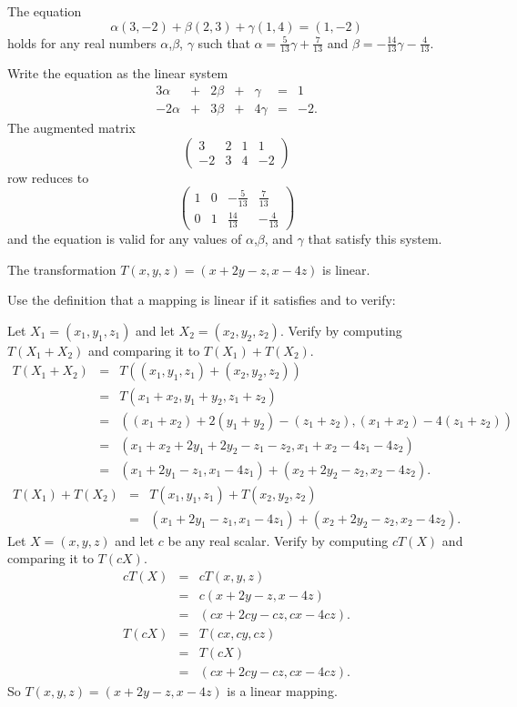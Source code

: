 \ans The equation
\[ \alpha(3,-2) + \beta(2,3) + \gamma(1,4) = (1,-2) \]
holds for any real numbers $\alpha$,$\beta$,
$\gamma$ such that $\alpha = \frac{5}{13}\gamma +
\frac{7}{13}$ and $\beta = -\frac{14}{13}\gamma
- \frac{4}{13}$.

\soln Write the equation as the linear system
\[ \begin{array}{rrrrrrl}
3\alpha & + & 2\beta & + & \gamma & = & 1 \\
-2\alpha & + & 3\beta & + & 4\gamma & = & -2. \end{array} \]
The augmented matrix
\[ \left(\begin{array}{rrr|r}
3 & 2 & 1 & 1 \\
-2 & 3 & 4 & -2 \end{array}\right) \]
row reduces to
\[ \left(\begin{array}{rrr|r}
1 & 0 & -\frac{5}{13} & \frac{7}{13} \\
0 & 1 & \frac{14}{13} & -\frac{4}{13} \end{array}\right) \]
and the equation is valid for any values of $\alpha$,$\beta$,
and $\gamma$ that satisfy this system.

 \ans The transformation $T(x,y,z) = (x + 2y - z, x - 4z)$
is linear.

\soln Use the definition that a mapping is linear if it satisfies
 and  to verify:

\para Let $X_1 = (x_1,y_1,z_1)$ and let $X_2 = (x_2,y_2,z_2)$.
Verify  by computing $T(X_1 + X_2)$ and comparing it
to $T(X_1) + T(X_2)$.
\[ \begin{array}{rcl}
T(X_1 + X_2) & = & T((x_1,y_1,z_1) + (x_2, y_2, z_2)) \\
& = & T(x_1 + x_2, y_1 + y_2, z_1 + z_2) \\
& = & ((x_1 + x_2) + 2(y_1 + y_2) - (z_1 + z_2),
(x_1 + x_2) - 4(z_1 + z_2)) \\ & = &
(x_1 + x_2 + 2y_1 + 2y_2 - z_1 - z_2, x_1 + x_2 - 4z_1 - 4z_2) \\
& = & (x_1 + 2y_1 - z_1, x_1 - 4z_1) +
(x_2 + 2y_2 - z_2, x_2 - 4z_2). \end{array} \]
\[ \begin{array}{rcl}
T(X_1) + T(X_2)
& = & T(x_1,y_1,z_1) + T(x_2,y_2,z_2) \\
& = & (x_1 + 2y_1 - z_1, x_1 - 4z_1) +
(x_2 + 2y_2 - z_2, x_2 - 4z_2). \end{array} \]
Let $X = (x,y,z)$ and let $c$ be any real scalar.  Verify
 by computing $cT(X)$ and comparing it to $T(cX)$.
\[ \begin{array}{rcl}
cT(X) & = & cT(x,y,z) \\
& = & c(x + 2y - z, x - 4z) \\
& = & (cx + 2cy - cz, cx - 4cz). \end{array} \]
\[ \begin{array}{rcl}
T(cX) & = & T(cx,cy,cz) \\
& = & T(cX) \\
& = & (cx + 2cy - cz, cx - 4cz). \end{array} \]
So $T(x,y,z) = (x + 2y - z, x - 4z)$ is a linear mapping.

